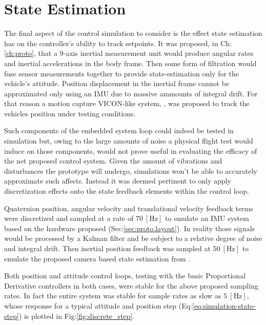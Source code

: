 \section{State Estimation}
\label{sec:simulation.state}
The final aspect of the control simulation to consider is the effect state estimation has on the controller's ability to track setpoints. It was proposed, in Ch:\ref{ch:proto}, that a 9-axis inertial measurement unit would produce angular rates and inertial accelerations in the body frame. Then some form of filtration would fuse sensor measurements together to provide state-estimation only for the vehicle's attitude. Position displacement in the inertial frame cannot be approximated only using an IMU due to massive ammounts of integral drift. For that reason a motion capture VICON-like system, \cite{arnold}, was proposed to track the vehicles position under testing conditions. 
\par
Such components of the embedded system loop could indeed be tested in simulation but, owing to the large amounts of noise a physical flight test would induce on those components, would not prove useful in evaluating the efficacy of the net proposed control system. Given the amount of vibrations and disturbances the prototype will undergo, simulations won't be able to accurately approximate such affects. Instead it was deemed pertinent to only apply discretization effects onto the state feedback elements within the control loop.
\par
Quaternion position, angular velocity and translational velocity feedback terms were discretized and sampled at a rate of $70~[\text{Hz}]$ to emulate an IMU system based on the hardware proposed (Sec:\ref{sec:proto.layout}). In reality those signals would be processed by a Kalman filter and be subject to a relative degree of noise and integral drift. Then inertial position feedback was sampled at $50~[\text{Hz}]$ to emulate the proposed camera based state estimation from \cite{arnold}.
\par
Both position and attitude control loops, testing with the basic Proportional Derivative controllers in both cases, were stable for the above proposed sampling rates. In fact the entire system was stable for sample rates as slow as $5~[\text{Hz}]$, whose response for a typical attitude and position step (Eq:\ref{eq:simulation-state-step}) is plotted in Fig:\ref{fig:discrete_step}.
